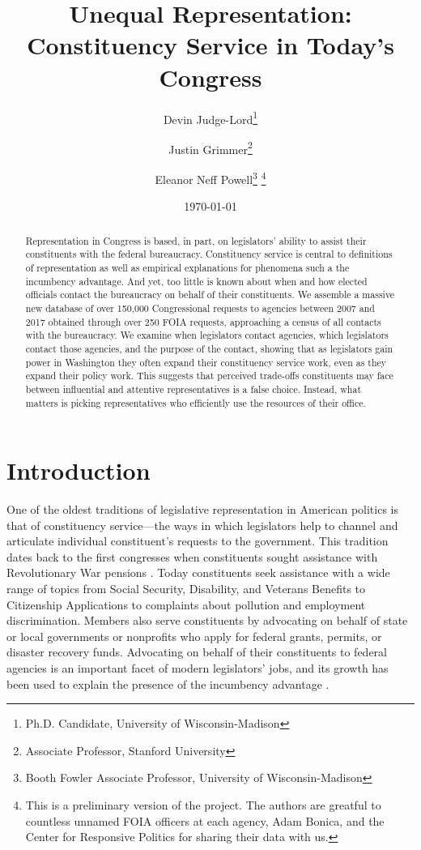 \documentclass{article}
\title{Unequal Representation: Constituency Service in Today's Congress}
\author{Devin Judge-Lord\thanks{Ph.D. Candidate, University of Wisconsin-Madison}\and Justin Grimmer\thanks{Associate Professor, Stanford University} \and Eleanor Neff Powell\thanks{Booth Fowler Associate Professor, University of Wisconsin-Madison} \thanks{This is a preliminary version of the project.  The authors are greatful to countless unnamed FOIA officers at each agency, Adam Bonica, and the Center for Responsive Politics for sharing their data with us. }}
\date{\today}
\begin{document}
\maketitle


\begin{abstract}
\noindent Representation in Congress is based, in part, on legislators' ability to assist their constituents with the federal bureaucracy.  Constituency service is central to definitions of representation as well as empirical explanations for phenomena such a the incumbency advantage. And yet, too little is known about when and how elected officials contact the bureaucracy on behalf of their constituents. We assemble a massive new database of over 150,000 Congressional requests to agencies between 2007 and 2017 obtained through over 250 FOIA requests, approaching a census of all contacts with the bureaucracy. We examine when legislators contact agencies, which legislators contact those agencies, and the purpose of the contact, showing that as legislators gain power in Washington they often expand their constituency service work, even as they expand their policy work. This suggests that perceived trade-offs constituents may face between influential and attentive representatives is a false choice.  Instead, what matters is picking representatives who efficiently use the resources of their office. %
\end{abstract}

\newpage
\doublespacing
\section{Introduction}

One of the oldest traditions of legislative representation in American politics is that of constituency service---the ways in which legislators help to channel and articulate individual constituent's requests to the government.  This tradition dates back to the first congresses when constituents sought assistance with Revolutionary War pensions \citep{Eckman2017}. Today constituents seek assistance with a wide range of topics from Social Security, Disability, and Veterans Benefits to Citizenship Applications to complaints about pollution and employment discrimination. Members also serve constituents by advocating on behalf of state or local governments or nonprofits who apply for federal grants, permits, or disaster recovery funds. %
Advocating on behalf of their constituents to federal agencies is an important facet of modern legislators' jobs, and its growth has been used to explain the presence of the incumbency advantage \citep{King1991}.  
\end{document}
